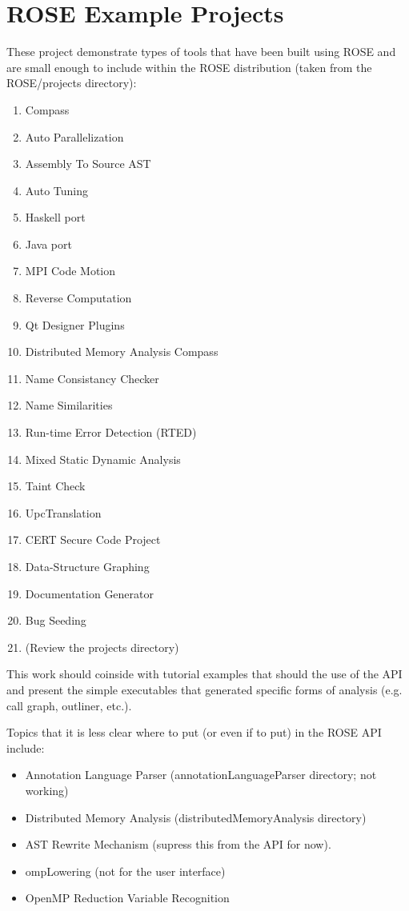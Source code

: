 \newpage


\section{ROSE Example Projects}
   These project demonstrate types of tools that have been built using ROSE and are 
small enough to include within the ROSE distribution (taken from the ROSE/projects
directory):
\begin{enumerate}
   \item Compass
   \item Auto Parallelization
   \item Assembly To Source AST
   \item Auto Tuning
   \item Haskell port
   \item Java port
   \item MPI Code Motion
   \item Reverse Computation
   \item Qt Designer Plugins
   \item Distributed Memory Analysis Compass
   \item Name Consistancy Checker
   \item Name Similarities
   \item Run-time Error Detection (RTED)
   \item Mixed Static Dynamic Analysis
   \item Taint Check
   \item UpcTranslation
   \item CERT Secure Code Project
   \item Data-Structure Graphing
   \item Documentation Generator
   \item Bug Seeding
   \item (Review the projects directory)
\end{enumerate}

This work should coinside with tutorial examples
that should the use of the API and present the
simple executables that generated specific 
forms of analysis (e.g. call graph, outliner, etc.).

Topics that it is less clear where to put (or even if
to put) in the ROSE API include:
\begin{itemize}
   \item Annotation Language Parser (annotationLanguageParser directory; not working)
   \item Distributed Memory Analysis (distributedMemoryAnalysis directory)
   \item AST Rewrite Mechanism (supress this from the API for now).
   \item ompLowering (not for the user interface)
   \item OpenMP Reduction Variable Recognition
\end{itemize}


